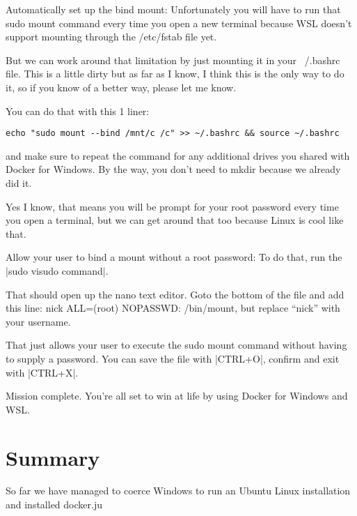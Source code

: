 Automatically set up the bind mount:
Unfortunately you will have to run that sudo mount command every time you open a new terminal because WSL doesn’t support mounting through the /etc/fstab file yet.

But we can work around that limitation by just mounting it in your ~/.bashrc file. This is a little dirty but as far as I know, I think this is the only way to do it, so if you know of a better way, please let me know.

You can do that with this 1 liner: 

\begin{verbatim}
echo "sudo mount --bind /mnt/c /c" >> ~/.bashrc && source ~/.bashrc 
\end{verbatim}

and make sure to repeat the command for any additional drives you shared with Docker for Windows. By the way, you don’t need to mkdir because we already did it.

Yes I know, that means you will be prompt for your root password every time you open a terminal, but we can get around that too because Linux is cool like that.

Allow your user to bind a mount without a root password:
To do that, run the |sudo visudo command|.

That should open up the nano text editor. Goto the bottom of the file and add this line: nick ALL=(root) NOPASSWD: /bin/mount, but replace “nick” with your username.

That just allows your user to execute the sudo mount command without having to supply a password. You can save the file with |CTRL+O|, confirm and exit with |CTRL+X|.

Mission complete. You’re all set to win at life by using Docker for Windows and WSL.


\section{Summary}

So far we have managed to coerce Windows to run an Ubuntu Linux installation and installed docker.ju





